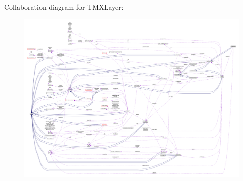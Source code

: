 Collaboration diagram for T\+M\+X\+Layer\+:
\nopagebreak
\begin{figure}[H]
\begin{center}
\leavevmode
\includegraphics[width=350pt]{classTMXLayer__coll__graph}
\end{center}
\end{figure}
